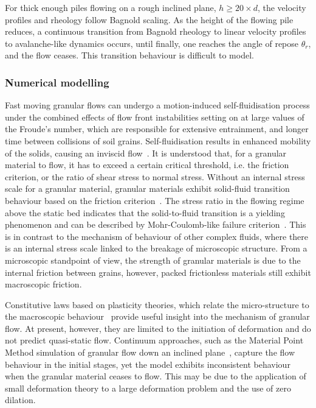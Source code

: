 For thick enough piles flowing on a rough inclined plane, $h \ge 20 \times 
d$, the velocity profiles and rheology follow Bagnold scaling. As the height of 
the flowing pile reduces, a continuous transition from Bagnold rheology to
linear velocity profiles to avalanche-like dynamics occurs, until 
finally, one reaches the angle of repose $\theta_r$, and the
flow ceases. This transition behaviour is difficult to model. 

\subsubsection{Numerical modelling}

Fast moving granular flows can undergo a motion-induced self-fluidisation 
process under the combined effects of flow front instabilities setting on at 
large values of the Froude's number, which are responsible for extensive 
entrainment, and longer time between collisions of soil grains. 
Self-fluidisation results in enhanced mobility of the solids, causing an 
inviscid flow~\citep{Bareschino2008}. It is understood that, for a granular 
material to flow, it has to exceed a certain critical threshold, i.e. the 
friction criterion, or the ratio of shear stress to normal stress. Without an
internal stress scale for a granular material, granular materials exhibit 
solid-fluid transition behaviour based on the friction 
criterion~\citep{Forterre2008}. The stress ratio in the flowing regime above 
the static bed indicates that the solid-to-fluid transition is a yielding 
phenomenon and can be described by Mohr-Coulomb-like failure 
criterion~\citep{Zhang1992}. This is in contrast to the mechanism of behaviour 
of other complex fluids, where there is an internal stress scale linked to the 
breakage of microscopic structure. From a microscopic standpoint of view, the 
strength of granular materials is due to the internal friction between 
grains, however, packed frictionless materials still exhibit macroscopic 
friction.

Constitutive laws based on plasticity theories, which relate the 
micro-structure to the macroscopic behaviour~\citep{Roux2002} provide 
useful insight into the mechanism of granular flow. At present, however, they 
are limited to the initiation of deformation and do not predict quasi-static 
flow. Continuum approaches, such as the Material Point Method simulation of 
granular flow down 
an inclined plane~\citep{Abe2006,Bandara2013}, capture the flow behaviour in 
the initial stages, yet the model exhibits inconsistent behaviour when the 
granular material ceases to flow. This may be due to the application of small 
deformation theory to a large deformation problem and the use of zero dilation. 

